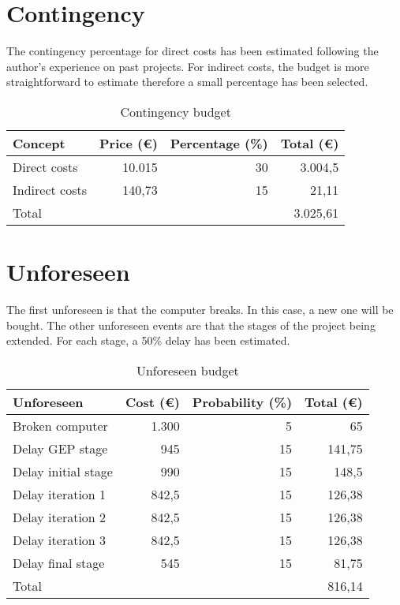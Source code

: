 \section{Contingency}
The contingency percentage for direct costs has been estimated following the author's experience on past projects. For indirect costs, the budget is more straightforward to estimate therefore a small percentage has been selected.
\begin{table}[h!]
	\centering
	\begin{tabular}{|l|r|r|r|}
		\hline
		\multicolumn{1}{|l|}{Concept} & \multicolumn{1}{l|}{Price (€)} & \multicolumn{1}{l|}{Percentage (\%)} & \multicolumn{1}{l|}{Total (€)} \\ \hline
		Direct costs & 10.015 & 30 & 3.004,5 \\ \hline
		Indirect costs & 140,73 & 15 & 21,11\\ \hline\hline
		Total & \multicolumn{3}{r|}{3.025,61} \\ \hline
	\end{tabular}
	\caption{Contingency budget}
	\label{Contingency}
\end{table}

\section{Unforeseen}
The first unforeseen is that the computer breaks. In this case, a new one will be bought. The other unforeseen events are that the stages of the project being extended. For each stage, a 50\% delay has been estimated.
\begin{table}[h!]
	\centering
	\begin{tabular}{|l|r|r|r|}
		\hline
		Unforeseen & \multicolumn{1}{l|}{Cost (€)} & \multicolumn{1}{l|}{Probability (\%)} & \multicolumn{1}{l|}{Total (€)} \\ \hline
		Broken computer & 1.300 & 5 & 65 \\ \hline
		Delay GEP stage & 945 & 15 & 141,75\\ \hline
		Delay initial stage & 990 & 15 & 148,5\\ \hline
		Delay iteration 1 & 842,5 & 15 & 126,38\\ \hline
		Delay iteration 2 & 842,5 & 15 & 126,38\\ \hline
		Delay iteration 3 & 842,5 & 15 & 126,38\\ \hline
		Delay final stage & 545 & 15 & 81,75\\ \hline\hline
		Total & \multicolumn{3}{r|}{816,14} \\ \hline
	\end{tabular}
	\caption{Unforeseen budget}
	\label{Unforeseen}
\end{table}

